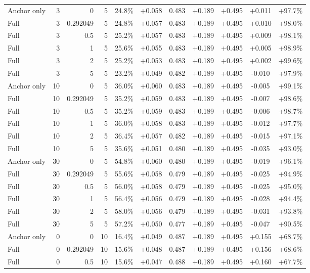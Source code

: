 \begin{table}[htbp]
\begin{tabular}{lrrrccccccc}
Anchor only & 3 & 0 & 5 & 24.8\% & +0.058 & 0.483 & +0.189 & +0.495 & +0.011 & +97.7\% \\
Full & 3 & 0.292049 & 5 & 24.8\% & +0.057 & 0.483 & +0.189 & +0.495 & +0.010 & +98.0\% \\
Full & 3 & 0.5 & 5 & 25.2\% & +0.057 & 0.483 & +0.189 & +0.495 & +0.009 & +98.1\% \\
Full & 3 & 1 & 5 & 25.6\% & +0.055 & 0.483 & +0.189 & +0.495 & +0.005 & +98.9\% \\
Full & 3 & 2 & 5 & 25.2\% & +0.053 & 0.483 & +0.189 & +0.495 & +0.002 & +99.6\% \\
Full & 3 & 5 & 5 & 23.2\% & +0.049 & 0.482 & +0.189 & +0.495 & -0.010 & +97.9\% \\
Anchor only & 10 & 0 & 5 & 36.0\% & +0.060 & 0.483 & +0.189 & +0.495 & -0.005 & +99.1\% \\
Full & 10 & 0.292049 & 5 & 35.2\% & +0.059 & 0.483 & +0.189 & +0.495 & -0.007 & +98.6\% \\
Full & 10 & 0.5 & 5 & 35.2\% & +0.059 & 0.483 & +0.189 & +0.495 & -0.006 & +98.7\% \\
Full & 10 & 1 & 5 & 36.0\% & +0.058 & 0.483 & +0.189 & +0.495 & -0.012 & +97.7\% \\
Full & 10 & 2 & 5 & 36.4\% & +0.057 & 0.482 & +0.189 & +0.495 & -0.015 & +97.1\% \\
Full & 10 & 5 & 5 & 35.6\% & +0.051 & 0.480 & +0.189 & +0.495 & -0.035 & +93.0\% \\
Anchor only & 30 & 0 & 5 & 54.8\% & +0.060 & 0.480 & +0.189 & +0.495 & -0.019 & +96.1\% \\
Full & 30 & 0.292049 & 5 & 55.6\% & +0.058 & 0.479 & +0.189 & +0.495 & -0.025 & +94.9\% \\
Full & 30 & 0.5 & 5 & 56.0\% & +0.058 & 0.479 & +0.189 & +0.495 & -0.025 & +95.0\% \\
Full & 30 & 1 & 5 & 56.4\% & +0.056 & 0.479 & +0.189 & +0.495 & -0.028 & +94.4\% \\
Full & 30 & 2 & 5 & 58.0\% & +0.056 & 0.479 & +0.189 & +0.495 & -0.031 & +93.8\% \\
Full & 30 & 5 & 5 & 57.2\% & +0.050 & 0.477 & +0.189 & +0.495 & -0.047 & +90.5\% \\
Anchor only & 0 & 0 & 10 & 16.4\% & +0.049 & 0.487 & +0.189 & +0.495 & +0.155 & +68.7\% \\
Full & 0 & 0.292049 & 10 & 15.6\% & +0.048 & 0.487 & +0.189 & +0.495 & +0.156 & +68.6\% \\
Full & 0 & 0.5 & 10 & 15.6\% & +0.047 & 0.488 & +0.189 & +0.495 & +0.160 & +67.7\% \\

\end{tabular}
\end{table}
